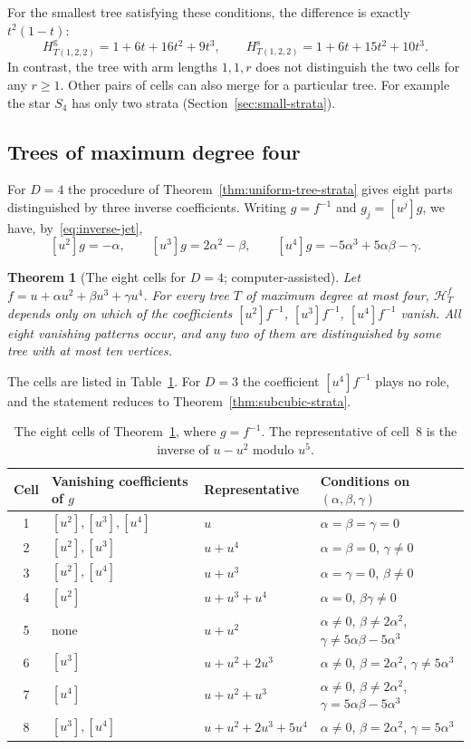 \documentclass[reqno]{article}
\theoremstyle{plain} %
\newtheorem{theorem}{Theorem}[section]
\theoremstyle{definition}
\theoremstyle{remark}
\newcommand{\hs}{\mathscr{H}}
\numberwithin{equation}{section}
\begin{document}
For the smallest tree satisfying these conditions, the difference is
exactly $t^2(1-t)$:
\[
H_{T(1,2,2)}^{\mathrm g}=1+6t+16t^2+9t^3,\qquad
H_{T(1,2,2)}^{\mathrm s}=1+6t+15t^2+10t^3.
\]
In contrast, the tree with arm lengths $1,1,r$ does not distinguish the
two cells for any $r\ge1$. Other pairs of cells can also merge for a
particular tree. For example the star $S_4$ has only two strata
(Section~\ref{sec:small-strata}).

\subsection{Trees of maximum degree four}
\label{sec:D4-cells}

For $D=4$ the procedure of Theorem~\ref{thm:uniform-tree-strata}
gives eight parts distinguished by three inverse coefficients. Writing
$g=f^{-1}$ and $g_j=[u^j]g$, we have, by~\eqref{eq:inverse-jet},
\[
[u^2]g=-\alpha,\qquad [u^3]g=2\alpha^2-\beta,\qquad [u^4]g=-5\alpha^3+5\alpha\beta-\gamma.
\]

\begin{theorem}[The eight cells for $D=4$; computer-assisted]
\label{thm:D4-strata}
Let $f=u+\alpha u^2+\beta u^3+\gamma u^4$. For every tree $T$ of maximum
degree at most four, $\hs_T^f$ depends only on which of the coefficients
$[u^2]f^{-1}$, $[u^3]f^{-1}$, $[u^4]f^{-1}$ vanish. All eight vanishing
patterns occur, and any two of them are distinguished by some tree with at
most ten vertices.
\end{theorem}

The cells are listed in Table~\ref{tab:D4-cells}. For $D=3$ the
coefficient $[u^4]f^{-1}$ plays no role, and the statement reduces to
Theorem~\ref{thm:subcubic-strata}.

\begin{table}[htbp]
\centering\renewcommand{\arraystretch}{1.15}
\begin{tabular}{clll}\toprule
Cell & Vanishing coefficients of $g$ & Representative & Conditions on $(\alpha,\beta,\gamma)$\\\midrule
1 & $[u^2],[u^3],[u^4]$ & $u$ & $\alpha=\beta=\gamma=0$\\
2 & $[u^2],[u^3]$ & $u+u^4$ & $\alpha=\beta=0$, $\gamma\ne0$\\
3 & $[u^2],[u^4]$ & $u+u^3$ & $\alpha=\gamma=0$, $\beta\ne0$\\
4 & $[u^2]$ & $u+u^3+u^4$ & $\alpha=0$, $\beta\gamma\ne0$\\
5 & none & $u+u^2$ & $\alpha\ne0$, $\beta\ne2\alpha^2$, $\gamma\ne5\alpha\beta-5\alpha^3$\\
6 & $[u^3]$ & $u+u^2+2u^3$ & $\alpha\ne0$, $\beta=2\alpha^2$, $\gamma\ne5\alpha^3$\\
7 & $[u^4]$ & $u+u^2+u^3$ & $\alpha\ne0$, $\beta\ne2\alpha^2$, $\gamma=5\alpha\beta-5\alpha^3$\\
8 & $[u^3],[u^4]$ & $u+u^2+2u^3+5u^4$ & $\alpha\ne0$, $\beta=2\alpha^2$, $\gamma=5\alpha^3$\\\bottomrule
\end{tabular}
\caption{The eight cells of Theorem~\ref{thm:D4-strata}, where
$g=f^{-1}$. The representative of cell~8 is the inverse of $u-u^2$
modulo $u^5$.}
\label{tab:D4-cells}
\end{table}
\end{document}
